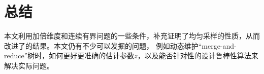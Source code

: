 \chapter{总结}

本文利用加倍维度和连续有界问题的一些条件，补充证明了均匀采样的性质，从而改进了\cite{Wang2021RobustAF}的结果。本文仍有不少可以发掘的问题，
例如动态维护“merge-and-reduce”树时，如何更好更准确的估计参数$z$，以及能否针对性的设计鲁棒性算法来解决实际问题。

